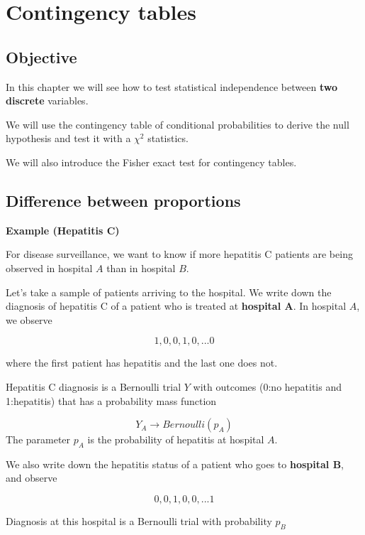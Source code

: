 \documentclass[
]{book}
\begin{document}
\hypertarget{contingency-tables}{%
\chapter{Contingency tables}\label{contingency-tables}}

\hypertarget{objective-10}{%
\section{Objective}\label{objective-10}}

In this chapter we will see how to test statistical independence between \textbf{two discrete} variables.

We will use the contingency table of conditional probabilities to derive the null hypothesis and test it with a \(\chi^2\) statistics.

We will also introduce the Fisher exact test for contingency tables.

\hypertarget{difference-between-proportions}{%
\section{Difference between proportions}\label{difference-between-proportions}}

\textbf{Example (Hepatitis C)}

For disease surveillance, we want to know if more hepatitis C patients are being observed in hospital \(A\) than in hospital \(B\).

Let's take a sample of patients arriving to the hospital. We write down the diagnosis of hepatitis C of a patient who is treated at \textbf{hospital A}. In hospital \(A\), we observe

\[1, 0, 0, 1, 0, ... 0\]

where the first patient has hepatitis and the last one does not.

Hepatitis C diagnosis is a Bernoulli trial \(Y\) with outcomes (0:no hepatitis and 1:hepatitis) that has a probability mass function

\[Y_A \rightarrow Bernoulli (p_A)\]
The parameter \(p_A\) is the probability of hepatitis at hospital \(A\).

We also write down the hepatitis status of a patient who goes to \textbf{hospital B}, and observe

\[0, 0, 1, 0, 0, ... 1\]

Diagnosis at this hospital is a Bernoulli trial with probability \(p_B\)
\end{document}

